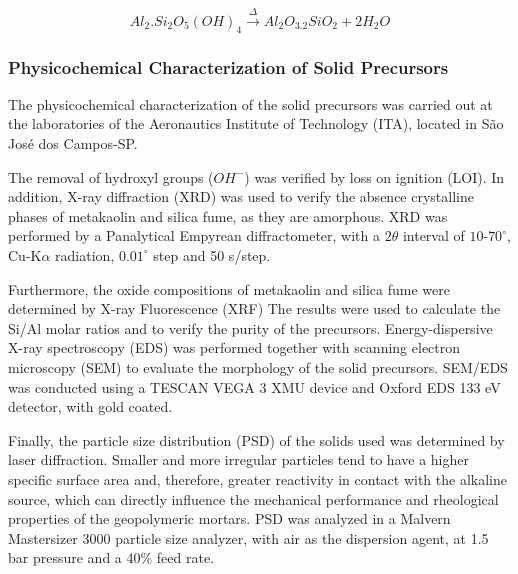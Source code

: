 \begin{equation}
    \label{eq:calcination_kaolin}
        Al_2.Si_2O_5\left(OH\right)_4 \xrightarrow{\Delta} Al_2O_3.2SiO_2 + 2 H_2O
\end{equation}

\subsubsection{Physicochemical Characterization of Solid Precursors}
\label{sec:physicochemical_characterization_precursors}

The physicochemical characterization of the solid precursors was carried out at the laboratories of the Aeronautics Institute of Technology (ITA), located in São José dos Campos-SP.

The removal of hydroxyl groups ($OH^-$) was verified by loss on ignition (LOI).
In addition, X-ray diffraction (XRD) was used to verify the absence crystalline phases of metakaolin and silica fume, as they are amorphous.
XRD was performed by a Panalytical Empyrean diffractometer, with a $2\theta$ interval of $10$-$70^\circ$, Cu-$\mathrm{K}\alpha$ radiation, $0.01^\circ$ step and 50 s/step.


Furthermore, the oxide compositions of metakaolin and silica fume were determined by X-ray Fluorescence (XRF)
The results were used to calculate the Si/Al molar ratios and to verify the purity of the precursors.
Energy-dispersive X-ray spectroscopy (EDS) was performed together with scanning electron microscopy (SEM) to evaluate the morphology of the solid precursors.
SEM/EDS was conducted using a TESCAN VEGA 3 XMU device and Oxford EDS 133 eV detector, with gold coated.

Finally, the particle size distribution (PSD) of the solids used was determined by laser diffraction. Smaller and more irregular particles tend to have a higher specific surface area and, therefore, greater reactivity in contact with the alkaline source, which can directly influence the mechanical performance and rheological properties of the geopolymeric mortars.
PSD was analyzed in a Malvern Mastersizer 3000 particle size analyzer, with air as the dispersion agent, at 1.5 bar pressure and a 40\% feed rate.

